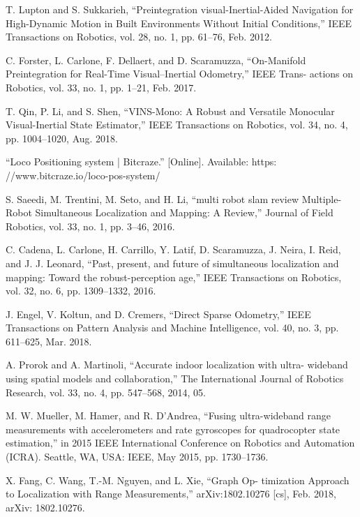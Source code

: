 \begin{translation}
\begin{thebibliography}{2}
  T. Lupton and S. Sukkarieh, “Preintegration visual-Inertial-Aided
Navigation for High-Dynamic Motion in Built Environments Without
Initial Conditions,” IEEE Transactions on Robotics, vol. 28, no. 1, pp.
61–76, Feb. 2012.

 C. Forster, L. Carlone, F. Dellaert, and D. Scaramuzza, “On-Manifold
Preintegration for Real-Time Visual–Inertial Odometry,” IEEE Trans-
actions on Robotics, vol. 33, no. 1, pp. 1–21, Feb. 2017.

T. Qin, P. Li, and S. Shen, “VINS-Mono: A Robust and Versatile
Monocular Visual-Inertial State Estimator,” IEEE Transactions on
Robotics, vol. 34, no. 4, pp. 1004–1020, Aug. 2018.

 “Loco Positioning system | Bitcraze.” [Online]. Available: https:
//www.bitcraze.io/loco-pos-system/


 S. Saeedi, M. Trentini, M. Seto, and H. Li, “multi robot slam review
Multiple-Robot Simultaneous Localization and Mapping: A Review,”
Journal of Field Robotics, vol. 33, no. 1, pp. 3–46, 2016.



C. Cadena, L. Carlone, H. Carrillo, Y. Latif, D. Scaramuzza, J. Neira,
I. Reid, and J. J. Leonard, “Past, present, and future of simultaneous
localization and mapping: Toward the robust-perception age,” IEEE
Transactions on Robotics, vol. 32, no. 6, pp. 1309–1332, 2016.


J. Engel, V. Koltun, and D. Cremers, “Direct Sparse Odometry,” IEEE
Transactions on Pattern Analysis and Machine Intelligence, vol. 40,
no. 3, pp. 611–625, Mar. 2018.

A. Prorok and A. Martinoli, “Accurate indoor localization with ultra-
wideband using spatial models and collaboration,” The International
Journal of Robotics Research, vol. 33, no. 4, pp. 547–568, 2014, 05.

M. W. Mueller, M. Hamer, and R. D’Andrea, “Fusing ultra-wideband
range measurements with accelerometers and rate gyroscopes for
quadrocopter state estimation,” in 2015 IEEE International Conference
on Robotics and Automation (ICRA). Seattle, WA, USA: IEEE, May
2015, pp. 1730–1736.


X. Fang, C. Wang, T.-M. Nguyen, and L. Xie, “Graph Op-
timization Approach to Localization with Range Measurements,”
arXiv:1802.10276 [cs], Feb. 2018, arXiv: 1802.10276.


\end{thebibliography}
\end{translation}
